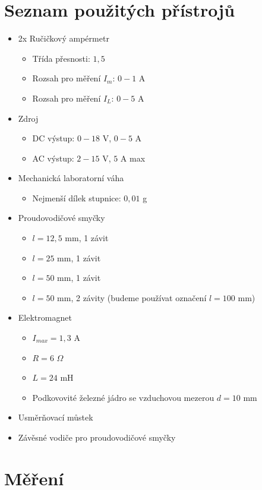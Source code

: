 \documentclass[a4paper,12pt]{article}
\begin{document}
\section{Seznam použitých přístrojů}
\begin{itemize}
    \item 2x Ručičkový ampérmetr
        \begin{itemize}
        \item Třída přesnosti: $1,5$
        \item Rozsah pro měření $I_m$: $0-1$ A
        \item Rozsah pro měření $I_L$: $0-5$ A
    \end{itemize}
    \item Zdroj
        \begin{itemize}
        \item DC výstup: $0-18$ V, $0-5$ A
        \item AC výstup: $2-15$ V, $5$ A max
    \end{itemize}
    \item Mechanická laboratorní váha
        \begin{itemize}
        \item Nejmenší dílek stupnice: $0,01$ g
    \end{itemize}
    \item Proudovodičové smyčky
        \begin{itemize}
        \item $l=12,5$ mm, 1 závit
        \item $l=25$ mm, 1 závit
        \item $l=50$ mm, 1 závit
        \item $l=50$ mm, 2 závity (budeme používat označení $l=100$ mm)
    \end{itemize}
    \item Elektromagnet
    \begin{itemize}
        \item $I_{max} = 1,3$ A
        \item $R = 6$ $\Omega$
        \item $L = 24$ mH
        \item Podkovovité železné jádro se vzduchovou mezerou $d=10$ mm
    \end{itemize}
    \item Usměrňovací můstek
    \item Závěsné vodiče pro proudovodičové smyčky
\end{itemize}
\section{Měření}
\end{document}
